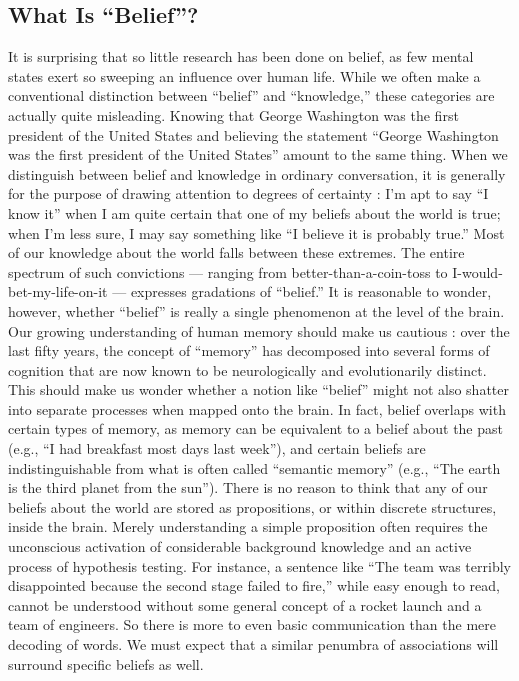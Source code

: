 \documentclass[a4paper,14pt]{extarticle}
\begin{document}
\subsection{What Is ``Belief''?}

It is surprising that so little research has been done on belief, as few mental states exert so sweeping an influence over human life.
While we often make a conventional distinction between ``belief'' and ``knowledge,'' these categories are actually quite misleading.
Knowing that George Washington was the first president of the United States and believing the statement ``George Washington was the first president of the United States'' amount to the same thing.
When we distinguish between belief and knowledge in ordinary conversation, it is generally for the purpose of drawing attention to degrees of certainty :
I’m apt to say ``I know it'' when I am quite certain that one of my beliefs about the world is true;
when I’m less sure, I may say something like ``I believe it is probably true.''
Most of our knowledge about the world falls between these extremes.
The entire spectrum of such convictions --- ranging from better-than-a-coin-toss to I-would-bet-my-life-on-it --- expresses gradations of ``belief.''
It is reasonable to wonder, however, whether ``belief'' is really a single phenomenon at the level of the brain.
Our growing understanding of human memory should make us cautious :
over the last fifty years, the concept of ``memory'' has decomposed into several forms of cognition that are now known to be neurologically and evolutionarily distinct.
This should make us wonder whether a notion like ``belief'' might not also shatter into separate processes when mapped onto the brain.
In fact, belief overlaps with certain types of memory, as memory can be equivalent to a belief about the past (e.g., ``I had breakfast most days last week''), and certain beliefs are indistinguishable from what is often called ``semantic memory'' (e.g., ``The earth is the third planet from the sun'').
There is no reason to think that any of our beliefs about the world are stored as propositions, or within discrete structures, inside the brain.
Merely understanding a simple proposition often requires the unconscious activation of considerable background knowledge and an active process of hypothesis testing.
For instance, a sentence like ``The team was terribly disappointed because the second stage failed to fire,'' while easy enough to read, cannot be understood without some general concept of a rocket launch and a team of engineers.
So there is more to even basic communication than the mere decoding of words.
We must expect that a similar penumbra of associations will surround specific beliefs as well.
\end{document}
